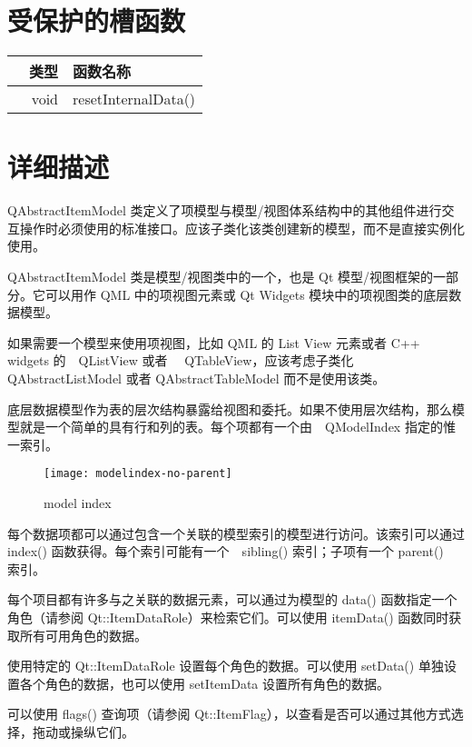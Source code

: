 \section{受保护的槽函数}

\splitLine

\begin{tabular}{|r|l|}
\hline
类型　	&函数名称\\
\hline
void	&resetInternalData()\\
\hline
\end{tabular}

\section{详细描述}

\splitLine

QAbstractItemModel 类定义了项模型与模型/视图体系结构中的其他组件进行交互操作时必须使用的标准接口。应该子类化该类创建新的模型，而不是直接实例化使用。

QAbstractItemModel 类是模型/视图类中的一个，也是 Qt 模型/视图框架的一部分。它可以用作 QML 中的项视图元素或 Qt Widgets 模块中的项视图类的底层数据模型。

如果需要一个模型来使用项视图，比如 QML 的 List View 元素或者 C++ widgets 的　QListView 或者　 QTableView，应该考虑子类化 QAbstractListModel 或者 QAbstractTableModel 而不是使用该类。

底层数据模型作为表的层次结构暴露给视图和委托。如果不使用层次结构，那么模型就是一个简单的具有行和列的表。每个项都有一个由　QModelIndex 指定的惟一索引。

\begin{figure}[hbt!]  
	\centering
    \texttt{[image: modelindex-no-parent]}
	\caption{model index}
\end{figure}

每个数据项都可以通过包含一个关联的模型索引的模型进行访问。该索引可以通过　index() 函数获得。每个索引可能有一个　sibling() 索引；子项有一个 parent()　索引。

每个项目都有许多与之关联的数据元素，可以通过为模型的 data() 函数指定一个角色（请参阅 Qt::ItemDataRole）来检索它们。可以使用 itemData() 函数同时获取所有可用角色的数据。

使用特定的 Qt::ItemDataRole 设置每个角色的数据。可以使用 setData() 单独设置各个角色的数据，也可以使用 setItemData 设置所有角色的数据。

可以使用 flags() 查询项（请参阅 Qt::ItemFlag），以查看是否可以通过其他方式选择，拖动或操纵它们。

